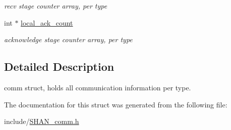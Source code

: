 \begin{DoxyCompactItemize}
\begin{DoxyCompactList}\small\item\em recv stage counter array, per type \end{DoxyCompactList}\item 
int $\ast$ \hyperlink{structshan__element__t_ad7a071488213341a6630658fb441f97a}{local\+\_\+ack\+\_\+count}\hypertarget{structshan__element__t_ad7a071488213341a6630658fb441f97a}{}\label{structshan__element__t_ad7a071488213341a6630658fb441f97a}

\begin{DoxyCompactList}\small\item\em acknowledge stage counter array, per type \end{DoxyCompactList}\end{DoxyCompactItemize}


\subsection{Detailed Description}
comm struct, holds all communication information per type. 

The documentation for this struct was generated from the following file\+:\begin{DoxyCompactItemize}
\item 
include/\hyperlink{SHAN__comm_8h}{S\+H\+A\+N\+\_\+comm.\+h}\end{DoxyCompactItemize}
